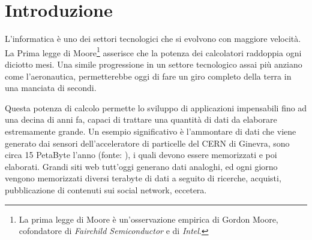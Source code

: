 
\chapter{Introduzione}\label{cap:introduzione}
L'informatica è uno dei settori tecnologici che si evolvono con maggiore velocità. La Prima legge di Moore\footnote{La prima legge di Moore è un'osservazione empirica di Gordon Moore, cofondatore di \emph{Fairchild Semiconductor} e di \emph{Intel}.} asserisce che la potenza dei calcolatori raddoppia ogni diciotto mesi. Una simile progressione in un settore tecnologico assai più anziano come l'aeronautica, permetterebbe oggi di fare un giro completo della terra in una manciata di secondi. 

Questa potenza di calcolo permette lo sviluppo di applicazioni impensabili fino ad una decina di anni fa, capaci di trattare una quantità di dati da elaborare estremamente grande. Un esempio significativo è l'ammontare di dati che viene generato dai sensori dell'acceleratore di particelle del CERN di Ginevra, sono circa 15 PetaByte l'anno (fonte: \cite{pres_cern}), i quali devono essere memorizzati e poi elaborati. Grandi siti web tutt'oggi generano dati analoghi, ed ogni giorno vengono memorizzati diversi terabyte di dati a seguito di ricerche, acquisti, pubblicazione di contenuti sui social network, eccetera. 
